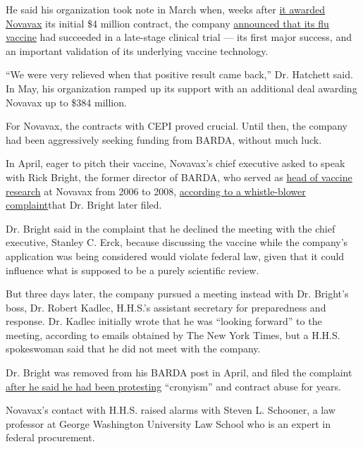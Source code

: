 He said his organization took note in March when, weeks after
\href{https://ir.novavax.com/news-releases/news-release-details/novavax-awarded-funding-cepi-covid-19-vaccine-development}{it
awarded Novavax} its initial \$4 million contract, the company
\href{https://ir.novavax.com/news-releases/news-release-details/novavax-nanoflu-achieves-all-primary-endpoints-phase-3-clinical}{announced
that its flu vaccine} had succeeded in a late-stage clinical trial ---
its first major success, and an important validation of its underlying
vaccine technology.

``We were very relieved when that positive result came back,'' Dr.
Hatchett said. In May, his organization ramped up its support with an
additional deal awarding Novavax up to \$384 million.

For Novavax, the contracts with CEPI proved crucial. Until then, the
company had been aggressively seeking funding from BARDA, without much
luck.

In April, eager to pitch their vaccine, Novavax's chief executive asked
to speak with Rick Bright, the former director of BARDA, who served as
\href{https://ir.novavax.com/news-releases/news-release-details/novavax-appoints-new-vice-president-vaccine-research}{head
of vaccine research} at Novavax from 2006 to 2008,
\href{https://www.cnn.com/2020/05/05/politics/rick-bright-full-complaint/index.html}{according
to a whistle-blower complaint}that Dr. Bright later filed.

Dr. Bright said in the complaint that he declined the meeting with the
chief executive, Stanley C. Erck, because discussing the vaccine while
the company's application was being considered would violate federal
law, given that it could influence what is supposed to be a purely
scientific review.

But three days later, the company pursued a meeting instead with Dr.
Bright's boss, Dr. Robert Kadlec, H.H.S.'s assistant secretary for
preparedness and response. Dr. Kadlec initially wrote that he was
``looking forward'' to the meeting, according to emails obtained by The
New York Times, but a H.H.S. spokeswoman said that he did not meet with
the company.

Dr. Bright was removed from his BARDA post in April, and filed the
complaint
\href{https://www.nytimes3xbfgragh.onion/2020/05/09/us/politics/whistle-blower-trump-coronavirus.html}{after
he said he had been protesting} ``cronyism'' and contract abuse for
years.

Novavax's contact with H.H.S. raised alarms with Steven L. Schooner, a
law professor at George Washington University Law School who is an
expert in federal procurement.

